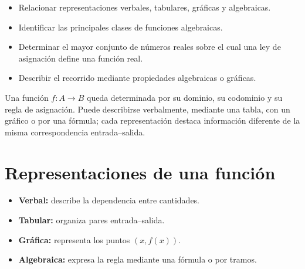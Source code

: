 \ifdefined\documentoSemanal
\else
\usepackage{tikz}
\usepackage{estilo_apuntes}
\usetikzlibrary{babel}


\fi
{}

\begin{objetivos}
\begin{itemize}
  \item Relacionar representaciones verbales, tabulares, gráficas y algebraicas.
  \item Identificar las principales clases de funciones algebraicas.
  \item Determinar el mayor conjunto de números reales sobre el cual una ley de asignación define una función real.
  \item Describir el recorrido mediante propiedades algebraicas o gráficas.
\end{itemize}
\end{objetivos}

\begin{resumen}
Una función $f:A\to B$ queda determinada por su dominio, su codominio y su regla de asignación. Puede describirse verbalmente, mediante una tabla, con un gráfico o por una fórmula; cada representación destaca información diferente de la misma correspondencia entrada--salida.
\end{resumen}

\section*{Representaciones de una función}

\begin{definicion}[representaciones]
\begin{itemize}
  \item \textbf{Verbal:} describe la dependencia entre cantidades.
  \item \textbf{Tabular:} organiza pares entrada--salida.
  \item \textbf{Gráfica:} representa los puntos $(x,f(x))$.
  \item \textbf{Algebraica:} expresa la regla mediante una fórmula o por tramos.
\end{itemize}
\end{definicion}

